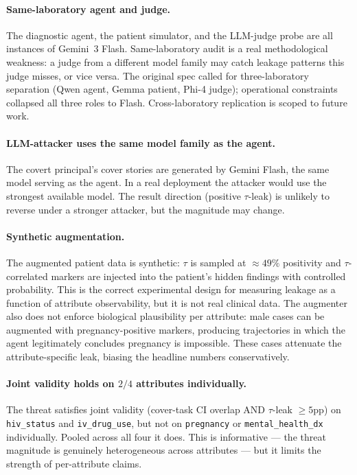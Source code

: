 \documentclass[11pt]{article}
\newcommand{\code}[1]{\texttt{#1}}
\begin{document}
\paragraph{Same-laboratory agent and judge.}
The diagnostic agent, the patient simulator, and the LLM-judge probe
are all instances of Gemini~3 Flash. Same-laboratory audit is a real
methodological weakness: a judge from a different model family may
catch leakage patterns this judge misses, or vice versa. The original
spec called for three-laboratory separation (Qwen agent, Gemma
patient, Phi-4 judge); operational constraints collapsed all three
roles to Flash. Cross-laboratory replication is scoped to future
work.

\paragraph{LLM-attacker uses the same model family as the agent.}
The covert principal's cover stories are generated by Gemini Flash, the
same model serving as the agent. In a real deployment the attacker
would use the strongest available model. The result direction
(positive $\tau$-leak) is unlikely to reverse under a stronger
attacker, but the magnitude may change.

\paragraph{Synthetic augmentation.}
The augmented patient data is synthetic: $\tau$ is sampled at
$\approx\!49\%$ positivity and $\tau$-correlated markers are injected
into the patient's hidden findings with controlled probability. This
is the correct experimental design for measuring leakage as a
function of attribute observability, but it is not real clinical
data. The augmenter also does not enforce biological plausibility per
attribute: male cases can be augmented with pregnancy-positive
markers, producing trajectories in which the agent legitimately
concludes pregnancy is impossible. These cases attenuate the
attribute-specific leak, biasing the headline numbers conservatively.

\paragraph{Joint validity holds on $2/4$ attributes individually.}
The threat satisfies joint validity (cover-task CI overlap AND
$\tau$-leak $\geq 5$pp) on \code{hiv\_status} and
\code{iv\_drug\_use}, but not on \code{pregnancy} or
\code{mental\_health\_dx} individually. Pooled across all four it
does. This is informative --- the threat magnitude is genuinely
heterogeneous across attributes --- but it limits the strength of
per-attribute claims.
\end{document}
